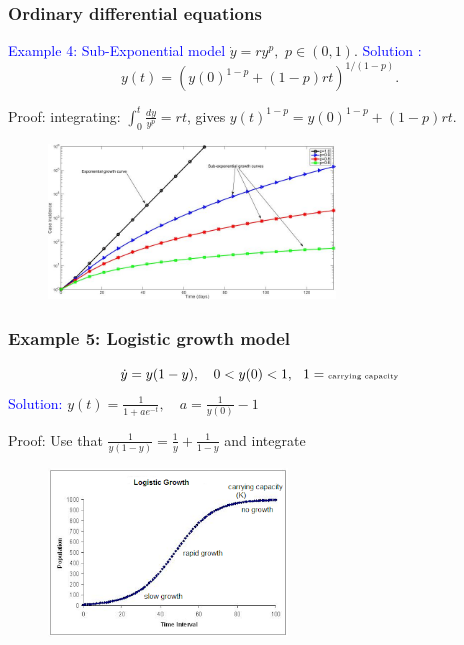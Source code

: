\documentclass[11pt,aspectratio=169]{beamer}
\begin{document}
\begin{frame}
\frametitle{Ordinary differential equations}
\begin{small}
\textcolor{blue}{Example 4: Sub-Exponential model} $\dot{y}=r y^p,$
$p \in (0,1)$. 
\vskip 10pt
 \textcolor{blue}{Solution :} $$y(t)=(y(0)^{1-p} +(1-p) rt)^{1/(1-p)}.$$

\begin{tiny}Proof: integrating: $\int_0^t \frac{dy}{y^p} =rt$, gives $y(t)^{1-p}=y(0)^{1-p}+(1-p)rt$. \end{tiny}


\begin{figure}
\includegraphics[width=3in]{img/growth} 
\end{figure}
\end{small}
\end{frame}

\begin{frame}
\frametitle{Example 5: Logistic growth model}
\begin{small}
$$\dot{y}=y(1-y), \quad \begin{tiny}0<y(0) <1, \quad 1=\text{carrying capacity}\end{tiny}$$
\vskip 12pt
\textcolor{blue}{Solution:} $
y(t)=\frac{1}{1+a e^{-t}}, \quad a=\frac{1}{y(0)}-1$
\end{small}
\begin{tiny}
Proof: Use that $\frac{1}{y(1-y)}=\frac{1}{y}+\frac{1}{1-y}$ and integrate
\end{tiny}
\begin{figure}
\includegraphics[width=2.5in]{img/LG.png} 
\end{figure}
\end{frame}
\end{document}
